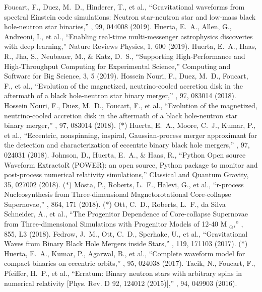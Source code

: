  Foucart, F., Duez, M.~D., Hinderer, T., et al., ``Gravitational waveforms from spectral Einstein code simulations: Neutron star-neutron star and low-mass black hole-neutron star binaries,'' \prd, 99, 044008 (2019).
 Huerta, E.~A., Allen, G., Andreoni, I., et al., ``Enabling real-time multi-messenger astrophysics discoveries with deep learning,'' Nature Reviews Physics, 1, 600 (2019).
 Huerta, E.~A., Haas, R., Jha, S., Neubauer, M., \& Katz, D.~S., ``Supporting High-Performance and High-Throughput Computing for Experimental Science,'' Computing and Software for Big Science, 3, 5 (2019).
 Hossein Nouri, F., Duez, M.~D., Foucart, F., et al., ``Evolution of the magnetized, neutrino-cooled accretion disk in the aftermath of a black hole-neutron star binary merger,'' \prd, 97, 083014 (2018).
 Hossein Nouri, F., Duez, M.~D., Foucart, F., et al., ``Evolution of the magnetized, neutrino-cooled accretion disk in the aftermath of a black hole-neutron star binary merger,'' \prd, 97, 083014 (2018).
 ($*$) Huerta, E.~A., Moore, C.~J., Kumar, P., et al., ``Eccentric, nonspinning, inspiral, Gaussian-process merger approximant for the detection and characterization of eccentric binary black hole mergers,'' \prd, 97, 024031 (2018).
 Johnson, D., Huerta, E.~A., \& Haas, R., ``Python Open source Waveform ExtractoR (POWER): an open source, Python package to monitor and post-process numerical relativity simulations,'' Classical and Quantum Gravity, 35, 027002 (2018).
 ($*$) M{\"o}sta, P., Roberts, L.~F., Halevi, G., et al., ``r-process Nucleosynthesis from Three-dimensional Magnetorotational Core-collapse Supernovae,'' \apj, 864, 171 (2018).
 ($*$) Ott, C.~D., Roberts, L.~F., da Silva Schneider, A., et al., ``The Progenitor Dependence of Core-collapse Supernovae from Three-dimensional Simulations with Progenitor Models of 12-40 M $_{{\ensuremath{\odot}}}$,'' \apjl, 855, L3 (2018).
 Fedrow, J.~M., Ott, C.~D., Sperhake, U., et al., ``Gravitational Waves from Binary Black Hole Mergers inside Stars,'' \prl, 119, 171103 (2017).
 ($*$) Huerta, E.~A., Kumar, P., Agarwal, B., et al., ``Complete waveform model for compact binaries on eccentric orbits,'' \prd, 95, 024038 (2017).
 Tacik, N., Foucart, F., Pfeiffer, H.~P., et al., ``Erratum: Binary neutron stars with arbitrary spins in numerical relativity [Phys. Rev. D 92, 124012 (2015)],'' \prd, 94, 049903 (2016).
